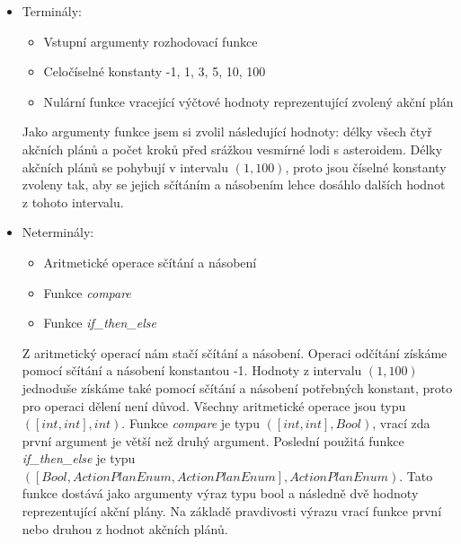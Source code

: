 \begin{itemize}
\item{
    Terminály:
    \begin{itemize}
        \item Vstupní argumenty rozhodovací funkce
        \item Celočíselné konstanty -1, 1, 3, 5, 10, 100
        \item Nulární funkce vracející výčtové hodnoty reprezentující zvolený akční plán  
    \end{itemize}
    Jako argumenty funkce jsem si zvolil následující hodnoty: délky všech čtyř akčních plánů a počet kroků před srážkou vesmírné lodi s asteroidem.
    Délky akčních plánů se pohybují v intervalu $(1,100)$, proto jsou číselné konstanty zvoleny tak, aby se jejich sčítáním a násobením lehce dosáhlo dalších hodnot z tohoto intervalu.
    }

\item{
    Neterminály:
    \begin{itemize}
        \item Aritmetické operace sčítání a násobení
        \item Funkce \emph{compare}
        \item Funkce \emph{if\_then\_else}
    \end{itemize}
    Z aritmetický operací nám stačí sčítání a násobení. Operaci odčítání získáme pomocí sčítání a násobení konstantou -1. 
    Hodnoty z intervalu $(1,100)$ jednoduše získáme také pomocí sčítání a násobení potřebných konstant, proto pro operaci dělení není důvod.
    Všechny aritmetické operace jsou typu $([int,int], int)$.
    Funkce \emph{compare} je typu $([int,int], Bool)$, vrací zda první argument je větší než druhý argument.
    Poslední použitá funkce \emph{if\_then\_else} je typu 
    \newline
    $([Bool, ActionPlanEnum, ActionPlanEnum], ActionPlanEnum)$. 
    Tato funkce dostává jako argumenty výraz typu bool a následně dvě hodnoty reprezentující akční plány. 
    Na základě pravdivosti výrazu vrací funkce první nebo druhou z hodnot akčních plánů.
}
\end{itemize}


